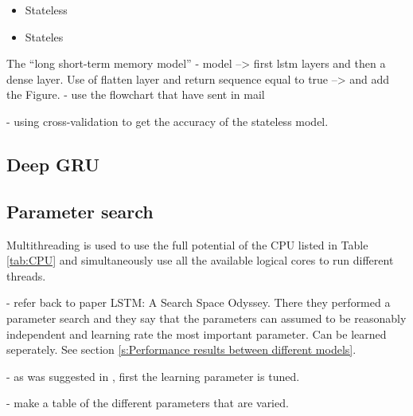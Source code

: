 \begin{itemize}
	\item Stateless
	\item Stateles
\end{itemize}

%


The ``long short-term memory model'' 
- model --> first lstm layers and then a dense layer.
Use of flatten layer and return sequence equal to true --> \cite{Kong2019} and add the Figure.
- use the flowchart that have sent in mail


- using cross-validation to get the accuracy of the stateless model.


\subsection{Deep GRU}\label{s:GRU_implementation}

\subsection{Parameter search}\label{s:Parameter search}
Multithreading is used to use the full potential of the CPU listed in Table \ref{tab:CPU} and simultaneously use all the available logical cores to run different threads. 

- refer back to paper LSTM: A Search Space Odyssey. There they performed a parameter search and they say that the parameters can assumed to be reasonably independent and learning rate the most important parameter. Can be learned seperately. See section \ref{s:Performance results between different models}.

- as was suggested in \cite{Greff2017}, first the learning parameter is tuned. 

- make a table of the different parameters that are varied. 

